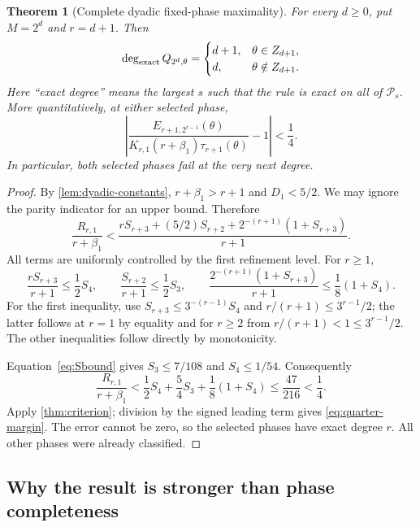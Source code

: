\documentclass[11pt,a4paper]{article}
\numberwithin{equation}{section}
\theoremstyle{plain}
\newtheorem{theorem}{Theorem}[section]
\theoremstyle{definition}
\theoremstyle{remark}
\newcommand{\Poly}{\mathcal P}
\newcommand{\abs}[1]{\left|#1\right|}
\begin{document}
\begin{theorem}[Complete dyadic fixed-phase maximality]
\label{thm:dyadic}
For every $d\ge0$, put $M=2^d$ and $r=d+1$. Then
\begin{equation}\label{eq:degree-classification}
 \deg_{\rm exact}Q_{2^d,\theta}=
 \begin{cases}
 d+1,&\theta\in Z_{d+1},\\
 d,&\theta\notin Z_{d+1}.
 \end{cases}
\end{equation}
Here ``exact degree'' means the largest $s$ such that the rule is exact on
all of $\Poly_s$. More quantitatively, at either selected phase,
\begin{equation}\label{eq:quarter-margin}
 \abs{\frac{E_{r+1,2^{r-1}}(\theta)}
 {K_{r,1}(r+\beta_1)\tau_{r+1}(\theta)}-1}
 <\frac14.
\end{equation}
In particular, both selected phases fail at the very next degree.
\end{theorem}
\begin{proof}
By \cref{lem:dyadic-constants}, $r+\beta_1>r+1$ and $D_1<5/2$.
We may ignore the parity indicator for an upper bound. Therefore
\[
 \frac{R_{r,1}}{r+\beta_1}
 <\frac{rS_{r+3}+(5/2)S_{r+2}
              +2^{-(r+1)}(1+S_{r+3})}{r+1}.
\]
All terms are uniformly controlled by the first refinement level.
For $r\ge1$,
\[
 \frac{rS_{r+3}}{r+1}\le\frac12S_4,
 \qquad \frac{S_{r+2}}{r+1}\le\frac12S_3,
 \qquad \frac{2^{-(r+1)}(1+S_{r+3})}{r+1}
 \le\frac18(1+S_4).
\]
For the first inequality, use
$S_{r+3}\le3^{-(r-1)}S_4$ and
$r/(r+1)\le3^{r-1}/2$; the latter follows at $r=1$ by equality and
for $r\ge2$ from $r/(r+1)<1\le3^{r-1}/2$.
The other inequalities follow directly by monotonicity.

Equation~\eqref{eq:Sbound} gives
$S_3\le7/108$ and $S_4\le1/54$. Consequently
\begin{equation}\label{eq:rational-margin}
 \frac{R_{r,1}}{r+\beta_1}
 <\frac12S_4+\frac54S_3+\frac18(1+S_4)
 \le\frac{47}{216}<\frac14.
\end{equation}
Apply \cref{thm:criterion}; division by the signed leading term gives
\eqref{eq:quarter-margin}. The error cannot be zero, so the selected
phases have exact degree $r$. All other phases were already classified.
\end{proof}

\subsection{Why the result is stronger than phase completeness}
\end{document}
